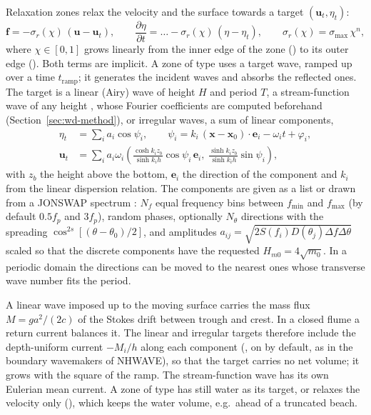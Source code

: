 Relaxation zones relax the velocity and the surface towards a target
$(\bm{u}_t,\eta_t)$:
\begin{equation}
  \bm{f} = -\sigma_r(\chi)\,(\bm{u}-\bm{u}_t),\qquad
  \frac{\partial \eta}{\partial t} = \ldots - \sigma_r(\chi)\,(\eta-\eta_t),\qquad
  \sigma_r(\chi) = \sigma_{\max}\,\chi^{n},
  \label{eq:relax}
\end{equation}
where $\chi\in[0,1]$ grows linearly from the inner edge of the zone
() to its outer edge (). Both terms are implicit. A zone of
type  uses a target wave, ramped up over a time
$t_{\mathrm{ramp}}$; it generates the incident waves and absorbs the
reflected ones. The target is a linear (Airy) wave of height $H$ and period
$T$, a stream-function wave of any height \citep{fenton1988}, whose Fourier
coefficients are computed beforehand (Section~\ref{sec:wd-method}), or
irregular waves, a sum of linear components,
\begin{equation}
  \begin{aligned}
  \eta_t &= \sum_i a_i\cos\psi_i,\qquad
  \psi_i = k_i\,(\bm{x}-\bm{x}_0)\cdot\bm{e}_i - \omega_i t + \varphi_i,\\
  \bm{u}_t &= \sum_i a_i\omega_i
  \left(\frac{\cosh k_i z_b}{\sinh k_i h}\cos\psi_i\,\bm{e}_i,\;
        \frac{\sinh k_i z_b}{\sinh k_i h}\sin\psi_i\right),
  \end{aligned}
  \label{eq:irregular}
\end{equation}
with $z_b$ the height above the bottom, $\bm{e}_i$ the direction of the
component and $k_i$ from the linear dispersion relation. The components are
given as a list or drawn from a JONSWAP spectrum \citep{hasselmann1973}:
$N_f$ equal frequency bins between $f_{\min}$ and $f_{\max}$ (by default
$0.5f_p$ and $3f_p$), random phases, optionally $N_\theta$ directions with
the spreading $\cos^{2s}[(\theta-\theta_0)/2]$, and amplitudes
$a_{ij} = \sqrt{2S(f_i)D(\theta_j)\Delta f\Delta\theta}$ scaled so that the
discrete components have the requested $H_{m0} = 4\sqrt{m_0}$. In a periodic
domain the directions can be moved to the nearest ones whose transverse
wave number fits the period.

A linear wave imposed up to the moving surface carries the mass flux
$M = g a^2/(2c)$ of the Stokes drift between trough and crest. In a closed
flume a return current balances it. The linear and irregular targets
therefore include the depth-uniform current $-M_i/h$ along each component
(, on by default, as in the boundary wavemakers of
NHWAVE), so that the target carries no net volume; it grows with the square
of the ramp. The stream-function wave has its own Eulerian mean current. A
zone of type  has still water as its target, or relaxes the
velocity only (), which keeps the water volume, e.g.\
ahead of a truncated beach.

